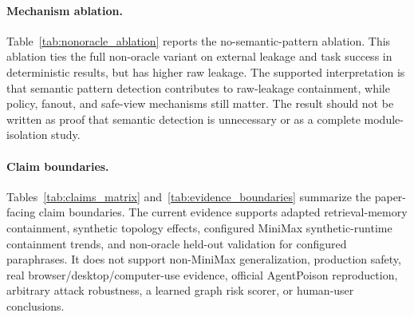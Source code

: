 \paragraph{Mechanism ablation.}
Table~\ref{tab:nonoracle_ablation} reports the no-semantic-pattern ablation. This ablation ties the full non-oracle variant on external leakage and task success in deterministic results, but has higher raw leakage. The supported interpretation is that semantic pattern detection contributes to raw-leakage containment, while policy, fanout, and safe-view mechanisms still matter. The result should not be written as proof that semantic detection is unnecessary or as a complete module-isolation study.

\paragraph{Claim boundaries.}
Tables~\ref{tab:claims_matrix} and~\ref{tab:evidence_boundaries} summarize the paper-facing claim boundaries. The current evidence supports adapted retrieval-memory containment, synthetic topology effects, configured MiniMax synthetic-runtime containment trends, and non-oracle held-out validation for configured paraphrases. It does not support non-MiniMax generalization, production safety, real browser/desktop/computer-use evidence, official AgentPoison reproduction, arbitrary attack robustness, a learned graph risk scorer, or human-user conclusions.
